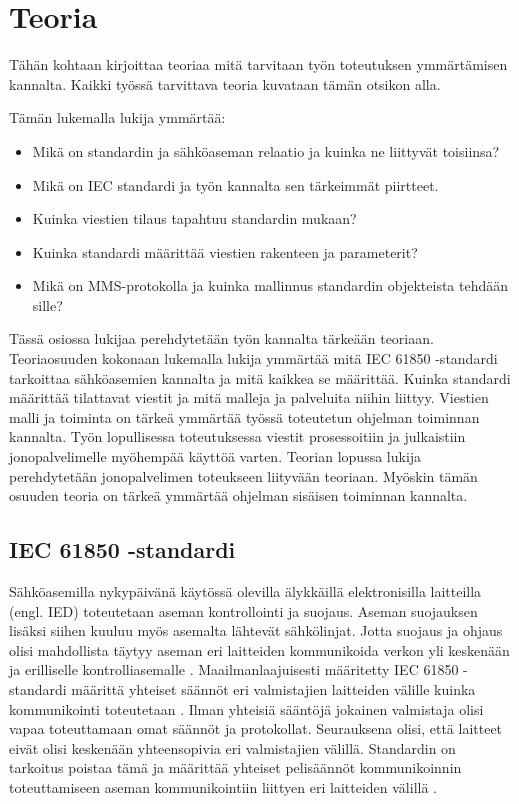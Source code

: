 \chapter{Teoria}
\label{ch:teoria}
\begin{it}
	Tähän kohtaan kirjoittaa teoriaa mitä tarvitaan työn toteutuksen ymmärtämisen kannalta. Kaikki työssä tarvittava teoria kuvataan tämän otsikon alla.

	Tämän lukemalla lukija ymmärtää:
	\begin{itemize}
		\item Mikä on standardin ja sähköaseman relaatio ja kuinka ne liittyvät toisiinsa?
		\item Mikä on IEC standardi ja työn kannalta sen tärkeimmät piirtteet.
		\item Kuinka viestien tilaus tapahtuu standardin mukaan?
		\item Kuinka standardi määrittää viestien rakenteen ja parameterit?
		\item Mikä on MMS-protokolla ja kuinka mallinnus standardin objekteista tehdään sille?
	\end{itemize}
\end{it}

Tässä osiossa lukijaa perehdytetään työn kannalta tärkeään teoriaan. Teoriaosuuden kokonaan lukemalla lukija ymmärtää mitä IEC 61850 -standardi tarkoittaa sähköasemien kannalta ja mitä kaikkea se määrittää. Kuinka standardi määrittää tilattavat viestit ja mitä malleja ja palveluita niihin liittyy. Viestien malli ja toiminta on tärkeä ymmärtää työssä toteutetun ohjelman toiminnan kannalta. Työn lopullisessa toteutuksessa viestit prosessoitiin ja julkaistiin jonopalvelimelle myöhempää käyttöä varten. Teorian lopussa lukija perehdytetään jonopalvelimen toteukseen liityvään teoriaan. Myöskin tämän osuuden teoria on tärkeä ymmärtää ohjelman sisäisen toiminnan kannalta.


\section{IEC 61850 -standardi}
Sähköasemilla nykypäivänä käytössä olevilla älykkäillä elektronisilla laitteilla (engl. IED) toteutetaan aseman kontrollointi ja suojaus. Aseman suojauksen lisäksi siihen kuuluu myös asemalta lähtevät sähkölinjat. Jotta suojaus ja ohjaus olisi mahdollista täytyy aseman eri laitteiden kommunikoida verkon yli keskenään ja erilliselle kontrolliasemalle \cite[s.~1]{Brunner2008}. Maailmanlaajuisesti määritetty IEC 61850 -standardi määrittä yhteiset säännöt eri valmistajien laitteiden välille kuinka kommunikointi toteutetaan \cite[s.~10]{IEC61850-7-1}. Ilman yhteisiä sääntöjä jokainen valmistaja olisi vapaa toteuttamaan omat säännöt ja protokollat. Seurauksena olisi, että laitteet eivät olisi keskenään yhteensopivia eri valmistajien välillä. Standardin on tarkoitus poistaa tämä ja määrittää yhteiset pelisäännöt kommunikoinnin toteuttamiseen aseman kommunikointiin liittyen eri laitteiden välillä \cite[s.~1]{Kaneda2008}.

